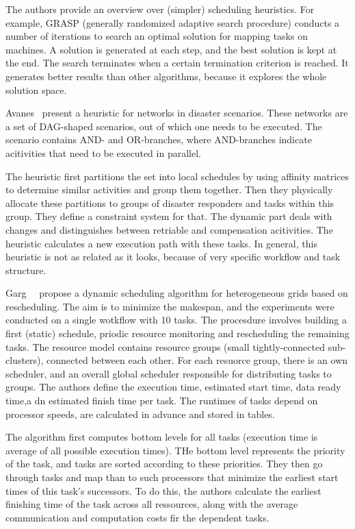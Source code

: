 \documentclass[sigconf,review,anonymous]{acmart}
\begin{document}
    The authors provide an overview over (simpler) scheduling heuristics.
    For example, GRASP (generally randomized adaptive search procedure) conducts a number of iterations to search an optimal
    solution for mapping tasks on machines.
    A solution is generated at each step, and the best solution is kept at the end.
    The search terminates when a certain termination criterion is reached.
    It generates better results than other algorithms, because it explores the whole solution space.

    Avanes~\etal\cite{avanes2008adaptive} present a heuristic for networks in disaster scenarios.
    These networks are a set of DAG-shaped scenarios, out of which one needs to be executed.
    The scenario contains AND- and OR-branches, where AND-branches indicate acitivities that need to be executed in parallel.

    The heuristic first partitions the set into local schedules by using affinity matrices to determine similar
    activities and group them together.
    Then they physically allocate these partitions to groups of disaster responders and tasks within this group.
    They define a constraint system for that.
    The dynamic part deals with changes and distinguishes between retriable and compensation acitivities.
    The heuristic calculates a new execution path with these tasks.
    In general, this heuristic is not as related as it looks, because of very specific workflow and task structure.

    Garg~\etal~\cite{GARG2015256} propose a dynamic scheduling algorithm for heterogeneous grids based on rescheduling.
    The aim is to minimize the makespan, and the experiments were conducted on a single wotkflow with 10 tasks.
    The procesdure involves building a first (static) schedule, priodic resource monitoring and rescheduling the remaining
    tasks.
    The resource model contains resource groups (small tightly-connected sub-clusters), connected between each other.
    For each resuorce group, there is an own scheduler, and an overall global scheduler responsible for distributing
    tasks to groups.
    The authors define the execution time, estimated start time, data ready time,a dn estimated finish time per task.
    The runtimes of tasks depend on processor speeds, are calculated in advance and stored in tables.

    The algorithm first computes bottom levels for all tasks (execution time is average of all possible execution times).
    THe bottom level represents the priority of the task, and tasks are sorted according to these priorities.
    They then go through tasks and map than to such processors that minimize the earliest start times of this task's
    successors.
    To do this, the authors calculate the earliest finishing time of the task across all ressources, along with the
    average communication and computation costs fir the dependent tasks.
\end{document}
